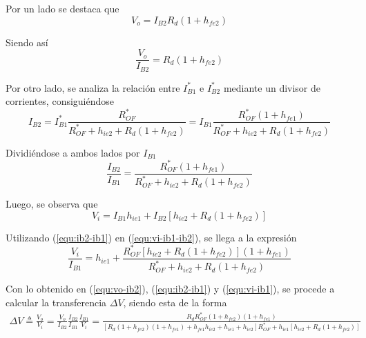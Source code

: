 Por un lado se destaca que 
\begin{equation*}
	V_o = I_{B2} R_d \left( 1 + h_{fe2} \right)
\end{equation*}

Siendo así
\begin{equation}
	\frac{V_o}{I_{B2}} = R_d \left( 1 + h_{fe2} \right)
\label{equ:vo-ib2}
\end{equation}

Por otro lado, se analiza la relación entre $I_{B1}^*$ e $I_{B2}^*$ mediante un divisor de corrientes, consiguiéndose
\begin{equation*}
	I_{B2} = I_{B1}^* \frac{R_{OF}^*}{R_{OF}^* + h_{ie2} + R_d \left( 1 + h_{fe2} \right)} = I_{B1} \frac{R_{OF}^* \left( 1 + h_{fe1} \right)}{R_{OF}^* + h_{ie2} + R_d \left( 1 + h_{fe2} \right)}
\end{equation*}

Dividiéndose a ambos lados por $I_{B1}$
\begin{equation}
	\frac{I_{B2}}{I_{B1}} = \frac{R_{OF}^* \left( 1 + h_{fe1} \right)}{R_{OF}^* + h_{ie2} + R_d \left( 1 + h_{fe2} \right)} 
\label{equ:ib2-ib1}
\end{equation}

Luego, se observa que
\begin{equation}
	V_i = I_{B1} h_{ie1} + I_{B2} \left[ h_{ie2} + R_d \left( 1 + h_{fe2} \right) \right]
\label{equ:vi-ib1-ib2}
\end{equation}

Utilizando (\ref{equ:ib2-ib1}) en (\ref{equ:vi-ib1-ib2}), se llega a la expresión
\begin{equation}
	\frac{V_i}{I_{B1}} =  h_{ie1} + \frac{ R_{OF}^* \left[ h_{ie2} + R_d \left( 1 + h_{fe2} \right) \right] \left( 1 + h_{fe1} \right)}{R_{OF}^* + h_{ie2} + R_d \left( 1 + h_{fe2} \right)}
\label{equ:vi-ib1}
\end{equation}

Con lo obtenido en (\ref{equ:vo-ib2}), (\ref{equ:ib2-ib1}) y (\ref{equ:vi-ib1}), se procede a calcular la transferencia $\Delta V$, siendo esta de la forma
\begin{equation}
\begin{split}
	\Delta V \triangleq \frac{V_o}{V_i} = \frac{V_o}{I_{B2}} \frac{I_{B2}}{I_{B1}} \frac{I_{B1}}{V_i} = \frac {R_d R_{OF}^* \left( 1+h_{fe2} \right) \left( 1+h_{fe1} \right) }{ \left[ R_d \left( 1+h_{fe2} \right) \left( 1+h_{fe1} \right) +h_{fe1}h_{ie2}+h_{ie1}+h_{ie2} \right] R_{OF}^*+h_{ie1} \left[ h_{ie2}+R_d \left( 1+h_{fe2} \right)  \right] }
\end{split}
\label{equ:v}
\end{equation}

